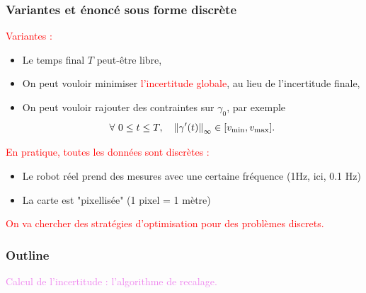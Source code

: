 \documentclass[11pt]{beamer}
\begin{document}
\begin{frame}

\frametitle{Variantes et énoncé sous forme discrète}


\textcolor{red}{Variantes :}
\begin{itemize}
	\item Le temps final $T$ peut-être libre,
	\item On peut vouloir minimiser \textcolor{red}{l'incertitude globale}, au lieu de l'incertitude finale,
	\item On peut vouloir rajouter des contraintes sur $\gamma_0$, par exemple
	\[
		\forall \ 0 \le t \le T, \quad \left\| \gamma'(t) \right\|_\infty \in [v_{\rm min}, v_{\rm max}].
	\]
\end{itemize}

\textcolor{red}{En pratique, toutes les données sont discrètes :}
\begin{itemize}
	\item Le robot réel prend des mesures avec une certaine fréquence (1Hz, ici, 0.1 Hz)
	\item La carte est "pixellisée" (1 pixel = 1 mètre)
\end{itemize}

\begin{center}
\textcolor{red}{On va chercher des stratégies d'optimisation pour des problèmes discrets.}
\end{center}

\end{frame}




\begin{frame}

\frametitle{Outline}


\begin{center}
\textcolor{violet}{
	\huge{Calcul de l'incertitude : l'algorithme de recalage.}}
\end{center}

\end{frame}


\end{document}
